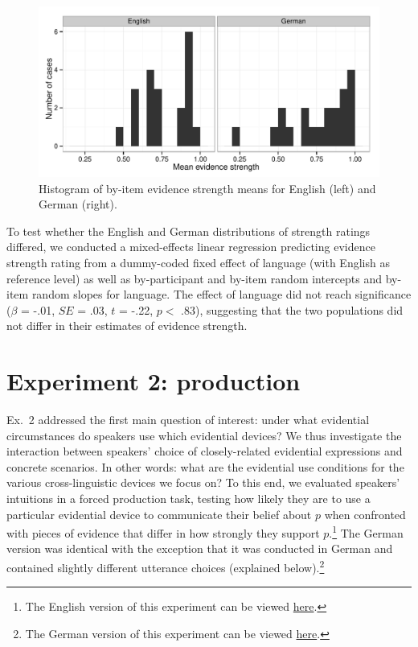 \documentclass[11pt]{article}
\begin{document}
\begin{figure}
\centering
\includegraphics[width=.9\textwidth]{pics/evidencestrength-histograms}
\caption{Histogram of by-item evidence strength means  for English (left) and German (right).}
\label{fig:evidencestrength}
\end{figure}


To test whether the English and German distributions of strength ratings differed, we conducted a mixed-effects linear regression predicting evidence strength rating from a dummy-coded fixed effect of language (with English as reference level) as well as by-participant and by-item random intercepts and by-item random slopes for language. The effect of language did not reach significance ($\beta$ = -.01, $SE$ = .03, $t$ = -.22, $p <$ .83), suggesting that the two populations did not differ in their estimates of evidence strength.   

\section{Experiment 2: production}


Ex.~2 addressed the first main question of interest: under what evidential circumstances do speakers use which evidential devices? We thus investigate the interaction between speakers’ choice of closely-related evidential expressions and concrete scenarios. In other words: what are the evidential use conditions for the various cross-linguistic devices we focus on? To this end, we evaluated speakers' intuitions in a forced production task, testing how likely they are to use a particular evidential device to communicate their belief about $p$ when confronted with pieces of evidence that differ in how strongly they support $p$.\footnote{The English version of this experiment can be viewed \href{http://stanford.edu/~jdegen/71_modals_forced_production/modals.html}{here}.} The German version was identical with the exception that it was conducted in German and contained slightly different utterance choices (explained below).\footnote{The German version of this experiment can be viewed \href{http://web.stanford.edu/~jdegen/cgi-bin/3_dp_production/modals.html}{here}.}
\end{document}
